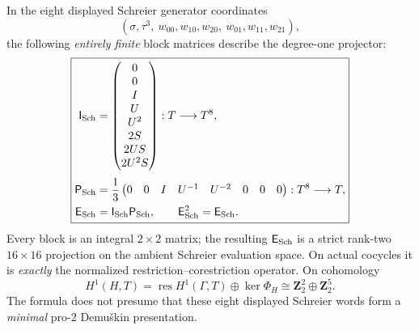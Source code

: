 \begin{theorem}
In the eight displayed
Schreier generator coordinates
\[
(\sigma,\tau^3,\
w_{00},w_{10},w_{20},\
w_{01},w_{11},w_{21}),
\]
the following \emph{entirely
finite} block matrices describe
the degree-one projector:
\begin{equation}\label{eq:dyadic-s3-schreier-16x16-projector}
\boxed{
\begin{aligned}
\mathsf I_{\rm Sch}&=
\begin{pmatrix}
0\\0\\I\\U\\U^2\\2S\\2US\\2U^2S
\end{pmatrix}:T\longrightarrow T^8,\\[3pt]
\mathsf P_{\rm Sch}&=\frac13
\begin{pmatrix}
0&0&I&U^{-1}&U^{-2}&0&0&0
\end{pmatrix}:T^8\longrightarrow T,\\
\mathsf E_{\rm Sch}
&=\mathsf I_{\rm Sch}\mathsf P_{\rm Sch},
\qquad
\mathsf E_{\rm Sch}^2=\mathsf E_{\rm Sch}.
\end{aligned}}
\end{equation}
Every block is an integral
$2\times2$ matrix; the resulting
$\mathsf E_{\rm Sch}$ is a
strict rank-two $16\times16$
projection on the ambient
Schreier evaluation space.
On actual cocycles it is
\emph{exactly} the normalized
restriction--corestriction
operator.  On cohomology
\begin{equation}\label{eq:dyadic-s3-h1-primitive-decomposition}
\boxed{\quad
H^1(H,T)
=\operatorname{res}H^1(\Gamma,T)
\oplus\ker\Phi_H
\cong\mathbf Z_2^2
\oplus\mathbf Z_2^5.
\quad}
\end{equation}
The formula does not presume
that these eight displayed
Schreier words form a
\emph{minimal} pro-$2$
Demu\v{s}kin presentation.
\end{theorem}

